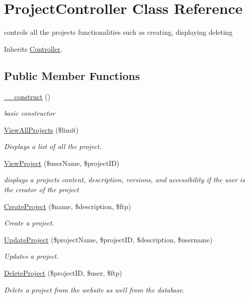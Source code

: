 \hypertarget{class_project_controller}{}\section{Project\+Controller Class Reference}
\label{class_project_controller}


controls all the project\textquotesingle{}s functionalities such as creating, displaying deleting  




Inherits \hyperlink{class_controller}{Controller}.

\subsection*{Public Member Functions}
\begin{DoxyCompactItemize}
\item 
\hyperlink{class_project_controller_a095c5d389db211932136b53f25f39685}{\+\_\+\+\_\+construct} ()
\begin{DoxyCompactList}\small\item\em basic constructor \end{DoxyCompactList}\item 
\hyperlink{class_project_controller_ab4f7e261c46439d3e850f0fb2a62b675}{View\+All\+Projects} (\$limit)
\begin{DoxyCompactList}\small\item\em Displays a list of all the project. \end{DoxyCompactList}\item 
\hyperlink{class_project_controller_aed2c87885c04d78b7b44cd207d65718d}{View\+Project} (\$user\+Name, \$project\+ID)
\begin{DoxyCompactList}\small\item\em displays a project\textquotesingle{}s content, description, versions, and accessibility if the user is the creator of the project \end{DoxyCompactList}\item 
\hyperlink{class_project_controller_a05a2a3a4236fc494310ba8aa360655ed}{Create\+Project} (\$name, \$description, \$ftp)
\begin{DoxyCompactList}\small\item\em Create a project. \end{DoxyCompactList}\item 
\hyperlink{class_project_controller_aaaadaf1c606b537d83daeb2995c86062}{Update\+Project} (\$project\+Name, \$project\+ID, \$description, \$username)
\begin{DoxyCompactList}\small\item\em Updates a project. \end{DoxyCompactList}\item 
\hyperlink{class_project_controller_a02b2ee7ea4d2170ef3ff1820c008f5c7}{Delete\+Project} (\$project\+ID, \$user, \$ftp)
\begin{DoxyCompactList}\small\item\em Delete a project from the website as well from the database. \end{DoxyCompactList}\end{DoxyCompactItemize}
